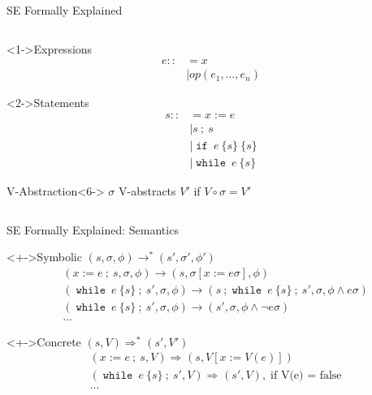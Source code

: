 \documentclass{beamer}
\DeclareMathOperator{\ifs}{\mathtt{if}}
\DeclareMathOperator{\whiles}{\mathtt{while}}
\begin{document}
\begin{frame}{SE Formally Explained~\parencite{boer2021}}
\begin{columns}[t]
    \begin{column}{.4\textwidth}
      \begin{block}<1->{Expressions}
        \vspace{-3ex}
        \begin{align*}
          e ::&= x \\
              & \mid op(e_{1},\ldots, e_{n})
        \end{align*}
      \end{block}
      \begin{block}<2->{Statements}
        \vspace{-3ex}
        \begin{align*}
          s ::&= x := e\\
              & \mid s~;~s\\
              & \mid \ifs~e~\{s\}~\{s\}\\
              & \mid \whiles~e~\{s\}
        \end{align*}
      \end{block}
      \begin{block}{V-Abstraction}<6->
        $\sigma$ V-abstracts $V'$ if $V \circ \sigma = V'$
      \end{block}
    \end{column}
  \end{columns}
\end{frame}

\newcommand{\Sstep}[2]{\ensuremath{#1 \rightarrow #2}}
\newcommand{\Sstar}[2]{\ensuremath{#1 \rightarrow^{*} #2}}
\newcommand{\Cstep}[3][]{\ensuremath{#2 \bm{\Rightarrow}_{#1} #3}}
\newcommand{\Cstar}[3][]{\ensuremath{#2 \bm{\Rightarrow^{*}}_{#1} #3}}

\begin{frame}{SE Formally Explained: Semantics}
  \begin{block}<+->{Symbolic $\Sstar{(s, \sigma, \phi)}{(s', \sigma', \phi')}$}
    \vspace{-3ex}
    \begin{align*}
      &\Sstep{(x := e~;~s, \sigma, \phi)}{(s, \sigma[x := e\sigma], \phi)}\\
      &\Sstep{(\whiles~e~\{s\}~;~s', \sigma, \phi)}{(s~;\whiles~e~\{s\}~;~s', \sigma, \phi\land e\sigma)}\\
      &\Sstep{(\whiles~e~\{s\}~;~s', \sigma, \phi)}{(s', \sigma, \phi\land \neg e\sigma)}\\
      &\ldots
    \end{align*}
  \end{block}
  \begin{block}<+->{Concrete $\Cstar{(s, V)}{(s', V')}$}
    \vspace{-3ex}
    \begin{align*}
      &\Cstep{(x := e~;~s, V)}{(s, V[x := V(e)])}\\
      &\Cstep{(\whiles~e~\{s\}~;~s', V)}{(s', V)}, \; \text{if V(e) = false}\\
      &\ldots
    \end{align*}
  \end{block}
\end{frame}
\end{document}
